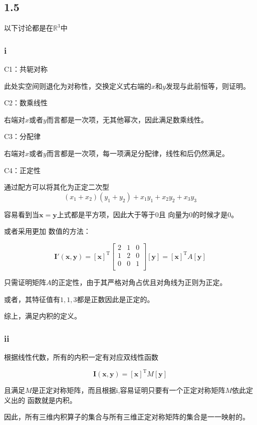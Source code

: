 \documentclass[UTF8,zihao=5]{ctexart}
\newcommand{\bm}[1]{{\mathbf{#1}}}
\newcommand{\trans}[0]{^\mathrm{T}}
\begin{document}
\subsection*{1.5}
以下讨论都是在$\mathbb{R}^3$中

\subsubsection*{i}

C1：共轭对称

此处实空间则退化为对称性，交换定义式右端的$x$和$y$发现与此前恒等，则证明。

C2：数乘线性

右端对$x$或者$y$而言都是一次项，无其他幂次，因此满足数乘线性。

C3：分配律

右端对$x$或者$y$而言都是一次项，每一项满足分配律，线性和后仍然满足。

C4：正定性

通过配方可以将其化为正定二次型
$$
(x_1+x_2)(y_1+y_2)+x_1y_1+x_2y_2+x_3y_3
$$

容易看到当$\bm{x}=\bm{y}$上式都是平方项，因此大于等于0且
向量为0的时候才是0。

或者采用更加
数值的方法：

$$
\bm{I'(x,y)}
=
[\bm{x}]\trans
\begin{bmatrix}
    2&1&0\\
    1&2&0\\
    0&0&1\\
\end{bmatrix}
[\bm{y}]=[\bm{x}]\trans
A
[\bm{y}]
$$

只需证明矩阵$A$的正定性，由于其严格对角占优且对角线为正则为正定。

或者，其特征值有$1,1,3$都是正数因此是正定的。

综上，满足内积的定义。

\subsubsection*{ii}

根据线性代数，所有的内积一定有对应双线性函数

\begin{equation}
\bm{I(x,y)}
=
[\bm{x}]\trans
M
[\bm{y}]
\end{equation}

且满足$M$是正定对称矩阵，而且根据i,容易证明只要有一个正定对称矩阵$M$依此定义出的
函数就是内积。

因此，所有三维内积算子的集合与所有三维正定对称矩阵的集合是一一映射的。
\end{document}
